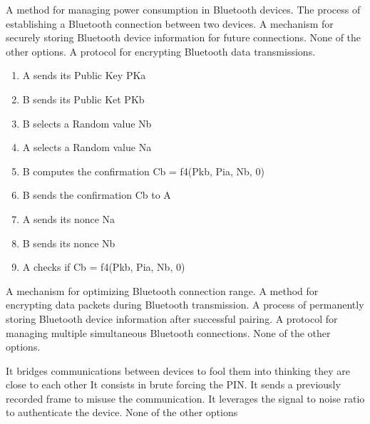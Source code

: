 \begin{checkboxes}
    \choice A method for managing power consumption in Bluetooth devices.
    \CorrectChoice The process of establishing a Bluetooth connection between two devices.
    \choice A mechanism for securely storing Bluetooth device information for future connections.
    \choice None of the other options.
    \choice A protocol for encrypting Bluetooth data transmissions.
\end{checkboxes}


\begin{solution}
    \begin{enumerate}
        \item A sends its Public Key PKa
        \item B sends its Public Ket PKb
        \item B selects a Random value Nb
        \item A selects a Random value Na
        \item B computes the confirmation Cb = f4(Pkb, Pia, Nb, 0)
        \item B sends the confirmation Cb to A
        \item A sends its nonce Na
        \item B sends its nonce Nb
        \item A checks if Cb = f4(Pkb, Pia, Nb, 0)
    \end{enumerate}
\end{solution}

\begin{checkboxes}
    \choice A mechanism for optimizing Bluetooth connection range.
    \choice A method for encrypting data packets during Bluetooth transmission.
    \CorrectChoice A process of permanently storing Bluetooth device information after successful pairing.
    \choice A protocol for managing multiple simultaneous Bluetooth connections.
    \choice None of the other options.
\end{checkboxes}

\begin{checkboxes}
    \CorrectChoice It bridges communications between devices to fool them into thinking they are close to each other
    \choice It consists in brute forcing the PIN.
    \choice It sends a previously recorded frame to misuse the communication.
    \choice It leverages the signal to noise ratio to authenticate the device.
    \choice None of the other options
\end{checkboxes}
